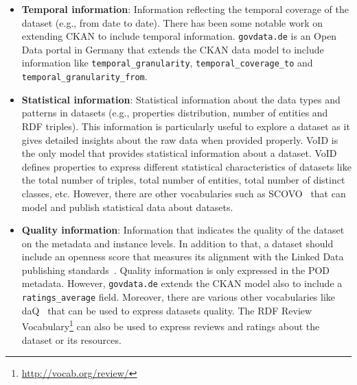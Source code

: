 \documentclass[a4paper,11pt,twoside]{ThesisStyle}
\begin{document}
\begin{itemize}
 \item \textbf{Temporal information}: Information reflecting the temporal coverage of the dataset (e.g., from date to date). There has been some notable work on extending CKAN to include temporal information. \texttt{govdata.de} is an Open Data portal in Germany that extends the CKAN data model to include information like \texttt{temporal\_granularity}, \texttt{temporal\_coverage\_to} and \\\texttt{temporal\_granularity\_from}.
 \item \textbf{Statistical information}: Statistical information about the data types and patterns in datasets (e.g., properties distribution, number of entities and RDF triples). This information is particularly useful to explore a dataset as it gives detailed insights about the raw data when provided properly. VoID is the only model that provides statistical information about a dataset. VoID defines properties to express different statistical characteristics of datasets like the total number of triples, total number of entities, total number of distinct classes, etc. However, there are other vocabularies such as SCOVO~\cite{Hausenblas:ESWC:09} that can model and publish statistical data about datasets.
 \item \textbf{Quality information}: Information that indicates the quality of the dataset on the metadata and instance levels. In addition to that, a dataset should include an openness score that measures its alignment with the Linked Data publishing standards~\cite{Berners-Lee:W3C:06}. Quality information is only expressed in the POD metadata. However, \texttt{govdata.de} extends the CKAN model also to include a \texttt{ratings\_average} field. Moreover, there are various other vocabularies like daQ~\cite{Debattista:WWW:14} that can be used to express datasets quality. The RDF Review Vocabulary\footnote{\url{http://vocab.org/review/}} can also be used to express reviews and ratings about the dataset or its resources.
\end{itemize}
\end{document}
